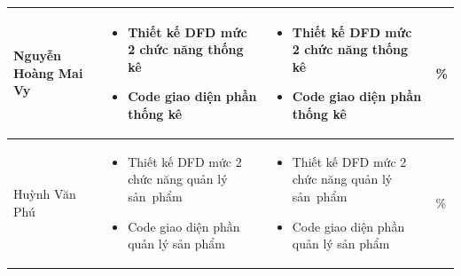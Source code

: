 \documentclass[a4paper,12pt]{report}
\begin{document}
\begin{center}
\begin{longtable}{|>{\centering\arraybackslash}p{3cm}|
        >{\centering\arraybackslash}p{5.5cm}|
        >{\centering\arraybackslash}p{5.5cm}|
        >{\centering\arraybackslash}p{1.5cm}|}
        Nguyễn Hoàng Mai Vy                                                                                                           &
        \begin{itemize}
            \item Thiết kế DFD mức 2 chức năng thống kê
            \item Code giao diện phần thống kê
        \end{itemize}
                                                                                                                                      &
        \begin{itemize}
            \item Thiết kế DFD mức 2 chức năng thống kê
            \item Code giao diện phần thống kê
        \end{itemize}
                                                                                                                                      & 100\% \\
        \hline
        Huỳnh Văn Phú                                                                                                                 &
        \begin{itemize}
            \item Thiết kế DFD mức 2 chức năng quản lý sản~phẩm
            \item Code giao diện phần quản lý sản phẩm
        \end{itemize}
                                                                                                                                      &
        \begin{itemize}
            \item Thiết kế DFD mức 2 chức năng quản lý sản~phẩm
            \item Code giao diện phần quản lý sản phẩm
        \end{itemize}                                                                           & 100\%                                       \\
        \hline
    \end{longtable}
\end{center}

\vspace{1em}
\end{document}
